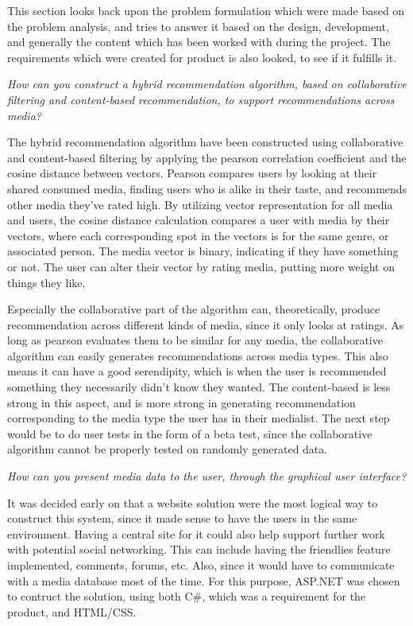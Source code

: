 This section looks back upon the problem formulation which were made based on the problem analysis, and tries to answer it based on the design, development, and generally the content which has been worked with during the project. The requirements which were created for product is also looked, to see if it fulfills it.

\textit{How can you construct a hybrid recommendation algorithm, based on collaborative filtering and content-based recommendation, to support recommendations across media?}

The hybrid recommendation algorithm have been constructed using collaborative and content-based filtering by applying the pearson correlation coefficient and the cosine distance between vectors. Pearson compares users by looking at their shared consumed media, finding users who is alike in their taste, and recommends other media they’ve rated high. By utilizing vector representation for all media and users, the cosine distance calculation compares a user with media by their vectors, where each corresponding spot in the vectors is for the same genre, or associated person. The media vector is binary, indicating if they have something or not. The user can alter their vector by rating media, putting more weight on things they like.

Especially the collaborative part of the algorithm can, theoretically, produce recommendation across different kinds of media, since it only looks at ratings. As long as pearson evaluates them to be similar for any media, the collaborative algorithm can easily generates recommendations across media types. This also means it can have a good serendipity, which is when the user is recommended something they necessarily didn’t know they wanted. The content-based is less strong in this aspect, and is more strong in generating recommendation corresponding to the media type the user has in their medialist. The next step would be to do user tests in the form of a beta test, since the collaborative algorithm cannot be properly tested on randomly generated data.

\textit{How can you present media data to the user, through the graphical user interface?}

It was decided early on that a website solution were the most logical way to construct this system, since it made sense to have the users in the same environment. Having a central site for it could also help support further work with potential social networking. This can include having the friendlies feature implemented, comments, forums, etc. Also, since it would have to communicate with a media database most of the time. For this purpose, ASP.NET was chosen to contruct the solution, using both C\#, which was a requirement for the product, and HTML/CSS. 

